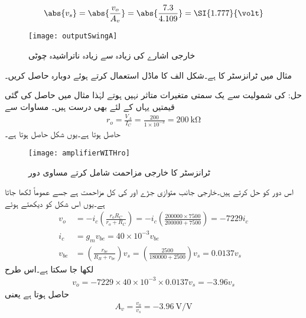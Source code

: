 \begin{align*}
\abs{v_s} = \abs{\frac{v_o}{A_v}}=\abs{\frac{7.3}{4.109}}=\SI{1.777}{\volt}
\end{align*}
%
\begin{figure}
\centering
\texttt{[image: outputSwingA]}
\caption{خارجی اشارے کی زیادہ سے زیادہ ناتراشیدہ چوٹی}
\label{شکل_خارجی_اشارے_کی_زیادہ_سے_زیادہ_ناتراشیدہ_چوٹی}
\end{figure}

مثال  میں ٹرانزسٹر کا   ہے۔شکل  الف کا ماڈل استعمال کرتے ہوئے  دوبارہ حاصل کریں۔

حل: کی شمولیت سے یک سمتی متغیرات متاثر نہیں ہوتے لہٰذا مثال  میں حاصل کی گئی قیمتیں یہاں کے لئے بھی درست ہیں۔
مساوات  سے
\begin{align*}
r_o=\frac{V_A}{I_{C}}=\frac{200}{1 \times 10^{-3}}=\SI{200}{\kilo \ohm}
\end{align*}
حاصل ہوتا ہے۔یوں شکل  حاصل ہوتا ہے۔
\begin{figure}
\centering
\texttt{[image: amplifierWITHro]}
\caption{ٹرانزسٹر کا خارجی مزاحمت شامل کرتے مساوی دور}
\label{شکل_ایمپلیفائر_خارجی_مزاحمت_شامل}
\end{figure}
اس دور کو حل کرتے ہیں۔خارجی جانب متوازی جڑے  اور  کی کل مزاحمت  ہے جسے عموماً  لکھا جاتا ہے۔یوں اس شکل کو دیکھتے ہوئے
\begin{align*}
v_o&=-i_c \left(\frac{r_o R_C}{r_o+R_C} \right)=-i_c \left(\frac{200000 \times 7500}{200000+7500} \right)=-7229 i_c \\
i_c&=g_m v_{be}=40 \times 10^{-3} v_{be}\\
v_{be}&=\left(\frac{r_{be}}{R_B+r_{be}} \right) v_s=\left(\frac{2500}{180000+2500} \right) v_s=0.0137 v_s
\end{align*}
لکھا جا سکتا ہے۔اس طرح
\begin{align*}
v_o=-7229 \times 40 \times 10^{-3} \times 0.0137 v_s=-3.96 v_s
\end{align*}
حاصل ہوتا ہے  یعنی
\begin{align*}
A_v=\frac{v_o}{v_s}=\SI[per=frac,fraction=nice]{-3.96}{\volt \per \volt}
\end{align*}


